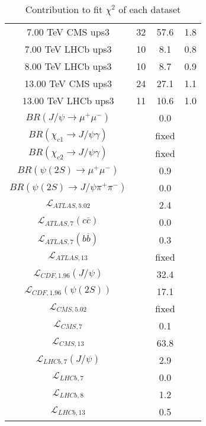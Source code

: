\begin{table}[h!]
\begin{tabular}{c|c|c|c}
7.00 TeV CMS ups3 & 32 & 57.6 & 1.8 \\
7.00 TeV LHCb ups3 & 10 & 8.1 & 0.8 \\
8.00 TeV LHCb ups3 & 10 & 8.7 & 0.9 \\
13.00 TeV CMS ups3 & 24 & 27.1 & 1.1 \\
13.00 TeV LHCb ups3 & 11 & 10.6 & 1.0 \\
\hline
$BR(J/\psi\rightarrow\mu^+\mu^-)$ &  & 0.0 &  \\
$BR(\chi_{c1}\rightarrow J/\psi\gamma)$ &  & fixed & \\
$BR(\chi_{c2}\rightarrow J/\psi\gamma)$ &  & fixed & \\
$BR(\psi(2S)\rightarrow\mu^+\mu^-)$ &  & 0.9 &  \\
$BR(\psi(2S)\rightarrow J/\psi\pi^+\pi^-)$ &  & 0.0 &  \\
$\mathcal L_{ATLAS,5.02}$ &  & 2.4 &  \\
$\mathcal L_{ATLAS,7}(c\overline c)$ &  & 0.0 &  \\
$\mathcal L_{ATLAS,7}(b\overline b)$ &  & 0.3 &  \\
$\mathcal L_{ATLAS,13}$ &  & fixed & \\
$\mathcal L_{CDF,1.96}(J/\psi)$ &  & 32.4 &  \\
$\mathcal L_{CDF,1.96}(\psi(2S))$ &  & 17.1 &  \\
$\mathcal L_{CMS,5.02}$ &  & fixed & \\
$\mathcal L_{CMS,7}$ &  & 0.1 &  \\
$\mathcal L_{CMS,13}$ &  & 63.8 &  \\
$\mathcal L_{LHCb,7}(J/\psi)$ &  & 2.9 &  \\
$\mathcal L_{LHCb,7}$ &  & 0.0 &  \\
$\mathcal L_{LHCb,8}$ &  & 1.2 &  \\
$\mathcal L_{LHCb,13}$ &  & 0.5 &  \\
\end{tabular}
\caption{Contribution to fit $\chi^2$ of each dataset}
\end{table}
